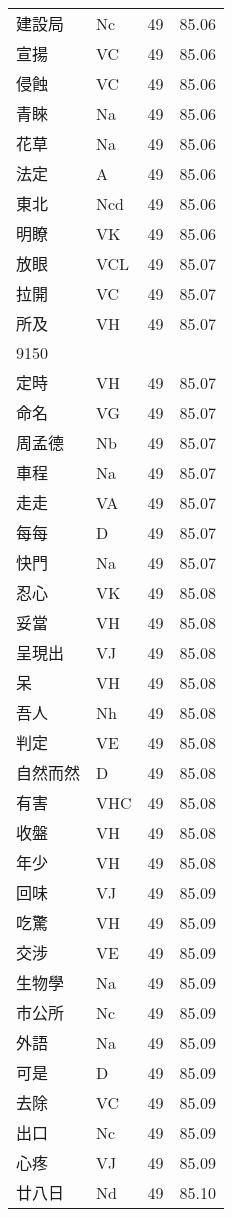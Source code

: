 \documentclass[twocolumn]{book}
\begin{document}
\begin{supertabular}{llrr}
建設局 & Nc & 49 &  85.06\\
宣揚 & VC & 49 &  85.06\\
侵蝕 & VC & 49 &  85.06\\
青睞 & Na & 49 &  85.06\\
花草 & Na & 49 &  85.06\\
法定 & A & 49 &  85.06\\
東北 & Ncd & 49 &  85.06\\
明瞭 & VK & 49 &  85.06\\
放眼 & VCL & 49 &  85.07\\
拉開 & VC & 49 &  85.07\\
所及 & VH & 49 &  85.07\\
9150\\
定時 & VH & 49 &  85.07\\
命名 & VG & 49 &  85.07\\
周孟德 & Nb & 49 &  85.07\\
車程 & Na & 49 &  85.07\\
走走 & VA & 49 &  85.07\\
每每 & D & 49 &  85.07\\
快門 & Na & 49 &  85.07\\
忍心 & VK & 49 &  85.08\\
妥當 & VH & 49 &  85.08\\
呈現出 & VJ & 49 &  85.08\\
呆 & VH & 49 &  85.08\\
吾人 & Nh & 49 &  85.08\\
判定 & VE & 49 &  85.08\\
自然而然 & D & 49 &  85.08\\
有害 & VHC & 49 &  85.08\\
收盤 & VH & 49 &  85.08\\
年少 & VH & 49 &  85.08\\
回味 & VJ & 49 &  85.09\\
吃驚 & VH & 49 &  85.09\\
交涉 & VE & 49 &  85.09\\
生物學 & Na & 49 &  85.09\\
市公所 & Nc & 49 &  85.09\\
外語 & Na & 49 &  85.09\\
可是 & D & 49 &  85.09\\
去除 & VC & 49 &  85.09\\
出口 & Nc & 49 &  85.09\\
心疼 & VJ & 49 &  85.09\\
廿八日 & Nd & 49 &  85.10\\

\end{supertabular}
\end{document}

